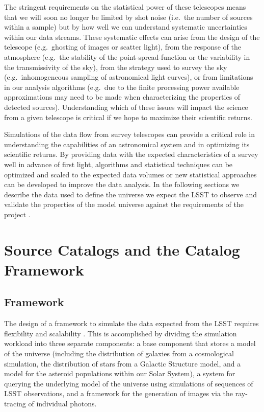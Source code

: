 \documentclass[]{article}
\begin{document}
{The stringent requirements on the statistical power of these
telescopes means that we will soon no longer be limited by shot noise
(i.e.\ the number of sources within a sample) but by how well we can
understand systematic uncertainties within our data streams. These
systematic effects can arise from the design of the telescope
(e.g.\ ghosting of images or scatter light), from the response of the
atmosphere (e.g.\ the stability of the point-spread-function or the
variability in the transmissivity of the sky), from the strategy used
to survey the sky (e.g.\ inhomogeneous sampling of astronomical light
curves), or from limitations in our analysis algorithms (e.g.\ due to
the finite processing power available approximations may need to be
made when characterizing the properties of detected
sources). Understanding which of these issues will impact the science
from a given telescope is critical if we hope to maximize their
scientific returns.

Simulations of the data flow from survey telescopes can provide a
critical role in understanding the capabilities of an astronomical
system and in optimizing its scientific returns. By providing data
with the expected characteristics of a survey well in advance of first
light, algorithms and statistical techniques can be optimized and
scaled to the expected data volumes or new statistical approaches can
be developed to improve the data analysis. 
In the following sections we describe the data used to define the universe
we expect the LSST to observe and validate the properties of the model
universe against the requirements of the project \citep{requirements}.

\section{Source Catalogs and the Catalog Framework}

\subsection{Framework}


The design of a framework to simulate the data expected from the LSST
requires flexibility and scalability \citep{connolly10}.
This is accomplished by dividing the simulation workload into three
separate components: a base component that stores a model of the
universe (including the distribution of galaxies from a cosmological
simulation, the distribution of stars from a Galactic Structure model,
and a model for the asteroid populations within our Solar System), a
system for querying the underlying model of the universe using
simulations of sequences of LSST observations, and a framework for the
generation of images via the ray-tracing of individual photons.


}
\end{document}
